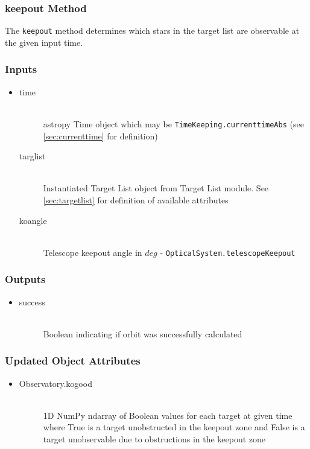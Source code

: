 \documentclass[cleanfoot]{asme2ej}
\begin{document}
\subsubsection{keepout Method} \label{sec:keepouttask} 
The \verb+keepout+ method determines which stars in the target list are observable at the given input time.

\subsubsection*{Inputs}
\begin{itemize}
    \item
    \begin{description}
        \item[time] \hfill \\
        astropy Time object which may be \verb+TimeKeeping.currenttimeAbs+ (see \ref{sec:currenttime} for definition)
        \item[targlist] \hfill \\
        Instantiated Target List object from Target List module. See \ref{sec:targetlist} for definition of available attributes
        \item[koangle] \hfill \\
        Telescope keepout angle in $ deg $ - \verb+OpticalSystem.telescopeKeepout+
    \end{description}
\end{itemize}

\subsubsection*{Outputs}
\begin{itemize}
    \item
    \begin{description}
        \item[success] \hfill \\
        Boolean indicating if orbit was successfully calculated
    \end{description}
\end{itemize}

\subsubsection*{Updated Object Attributes}
\begin{itemize}
    \item 
    \begin{description}
        \item[Observatory.kogood] \hfill \\
        1D NumPy ndarray of Boolean values for each target at given time where True is a target unobstructed in the keepout zone and False is a target unobservable due to obstructions in the keepout zone
    \end{description}
\end{itemize}
\end{document}
